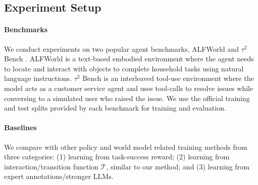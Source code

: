 \documentclass{article}
\theoremstyle{plain}
\theoremstyle{definition}
\theoremstyle{remark}
\begin{document}
\subsection{Experiment Setup}
\label{subsec:Experiment Setup}
\paragraph{Benchmarks} We conduct experiments on two popular agent benchmarks, ALFWorld \cite{shridhar2021alfworldaligningtextembodied} and $\tau^2$ Bench \cite{barres2025tau2benchevaluatingconversationalagents}. ALFWorld is a text-based embodied environment where the agent needs to locate and interact with objects to complete household tasks using natural language instructions.
$\tau^2$ Bench is an interleaved tool-use environment where the model acts as a customer service agent and uses tool-calls to resolve issues while conversing to a simulated user who raised the issue.
We use the official training and test splits provided by each benchmark for training and evaluation.


\paragraph{Baselines}
We compare with other policy and world model related training methods from three categories: (1) learning from task-success reward; (2) learning from interaction/transition function $\mathcal{T}$, similar to our method; and (3) learning from expert annotations/stronger LLMs.
\end{document}
